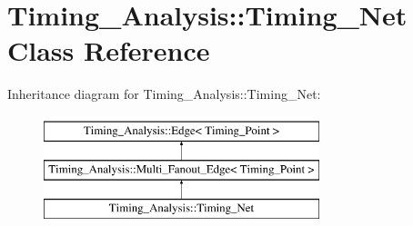 \hypertarget{classTiming__Analysis_1_1Timing__Net}{\section{Timing\-\_\-\-Analysis\-:\-:Timing\-\_\-\-Net Class Reference}
\label{classTiming__Analysis_1_1Timing__Net}
}
Inheritance diagram for Timing\-\_\-\-Analysis\-:\-:Timing\-\_\-\-Net\-:\begin{figure}[H]
\begin{center}
\leavevmode
\includegraphics[height=3.000000cm]{classTiming__Analysis_1_1Timing__Net}
\end{center}
\end{figure}
